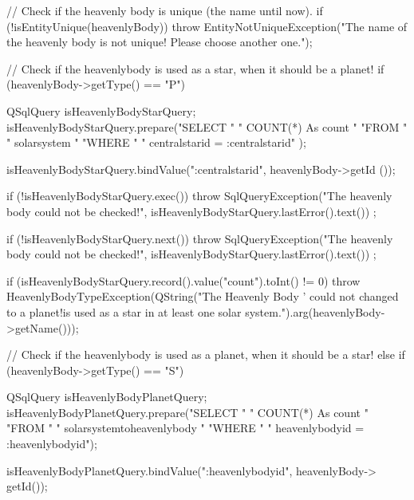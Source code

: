 \begin{DoxyCode}
{
    // Check if the heavenly body is unique (the name until now).
    if (!isEntityUnique(heavenlyBody))
    {
        throw EntityNotUniqueException("The name of the heavenly body is not
       unique! Please choose another one.");
    }

    // Check if the heavenlybody is used as a star, when it should be a planet!
    if (heavenlyBody->getType() == "P")
    {
        QSqlQuery isHeavenlyBodyStarQuery;
        isHeavenlyBodyStarQuery.prepare("SELECT "
                                        "       COUNT(*) As count "
                                        "FROM "
                                        "       solarsystem "
                                        "WHERE "
                                        "       centralstarid = :centralstarid"
      );

        isHeavenlyBodyStarQuery.bindValue(":centralstarid", heavenlyBody->getId
      ());

        if (!isHeavenlyBodyStarQuery.exec())
        {
            throw SqlQueryException("The heavenly body could not be checked!",
                                    isHeavenlyBodyStarQuery.lastError().text())
      ;
        }

        if (!isHeavenlyBodyStarQuery.next())
        {
            throw SqlQueryException("The heavenly body could not be checked!",
                                    isHeavenlyBodyStarQuery.lastError().text())
      ;
        }

        if (isHeavenlyBodyStarQuery.record().value("count").toInt() != 0)
        {
            throw HeavenlyBodyTypeException(QString("The Heavenly Body '%
       could not changed to a planet!\n\nIt is used as a star in at least one solar
       system.").arg(heavenlyBody->getName()));
        }
    }
    // Check if the heavenlybody is used as a planet, when it should be a star!
    else if (heavenlyBody->getType() == "S")
    {
        QSqlQuery isHeavenlyBodyPlanetQuery;
        isHeavenlyBodyPlanetQuery.prepare("SELECT "
                                          "       COUNT(*) As count "
                                          "FROM "
                                          "       solarsystemtoheavenlybody "
                                          "WHERE "
                                          "       heavenlybodyid =
       :heavenlybodyid");

        isHeavenlyBodyPlanetQuery.bindValue(":heavenlybodyid", heavenlyBody->
      getId());

}}
\end{DoxyCode}
